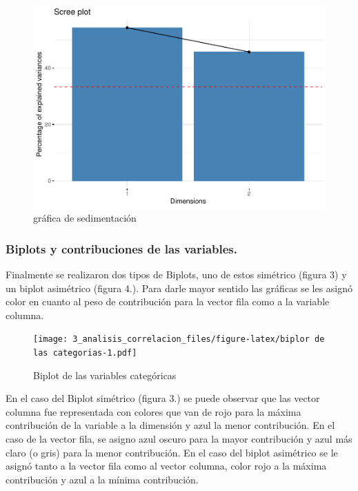 \documentclass[
]{article}
\begin{document}
\begin{figure}
\centering
\includegraphics{3_analisis_correlacion_files/figure-latex/Gráfica de sedimentación-1.pdf}
\caption{gráfica de sedimentación}
\end{figure}

\hypertarget{biplots-y-contribuciones-de-las-variables.}{%
\subsubsection{Biplots y contribuciones de las
variables.}\label{biplots-y-contribuciones-de-las-variables.}}

Finalmente se realizaron dos tipos de Biplots, uno de estos simétrico
(figura 3) y un biplot asimétrico (figura 4.). Para darle mayor sentido
las gráficas se les asignó color en cuanto al peso de contribución para
la vector fila como a la variable columna.

\begin{figure}
\centering
\texttt{[image: 3\_analisis\_correlacion\_files/figure-latex/biplor de las categorias-1.pdf]}
\caption{Biplot de las variables categóricas}
\end{figure}

En el caso del Biplot simétrico (figura 3.) se puede observar que las
vector columna fue representada con colores que van de rojo para la
máxima contribución de la variable a la dimensión y azul la menor
contribución. En el caso de la vector fila, se asigno azul oscuro para
la mayor contribución y azul más claro (o gris) para la menor
contribución. En el caso del biplot asimétrico se le asignó tanto a la
vector fila como al vector columna, color rojo a la máxima contribución
y azul a la mínima contribución.
\end{document}
